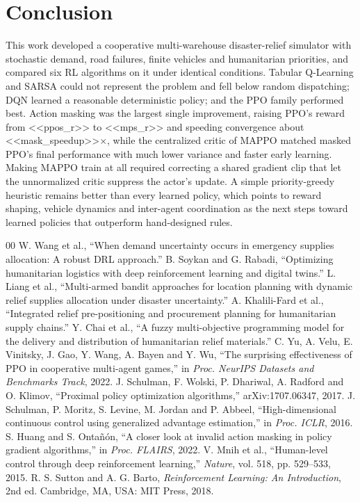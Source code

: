 \documentclass[conference]{IEEEtran}
\begin{document}
\section{Conclusion}
This work developed a cooperative multi-warehouse disaster-relief simulator with stochastic demand, road failures, finite vehicles and humanitarian priorities, and compared six RL algorithms on it under identical conditions. Tabular Q-Learning and SARSA could not represent the problem and fell below random dispatching; DQN learned a reasonable deterministic policy; and the PPO family performed best. Action masking was the largest single improvement, raising PPO's reward from <<ppos_r>> to <<mps_r>> and speeding convergence about <<mask_speedup>>$\times$, while the centralized critic of MAPPO matched masked PPO's final performance with much lower variance and faster early learning. Making MAPPO train at all required correcting a shared gradient clip that let the unnormalized critic suppress the actor's update. A simple priority-greedy heuristic remains better than every learned policy, which points to reward shaping, vehicle dynamics and inter-agent coordination as the next steps toward learned policies that outperform hand-designed rules.


\begin{thebibliography}{00}
 W. Wang et al., ``When demand uncertainty occurs in emergency supplies allocation: A robust DRL approach.''
 B. Soykan and G. Rabadi, ``Optimizing humanitarian logistics with deep reinforcement learning and digital twins.''
 L. Liang et al., ``Multi-armed bandit approaches for location planning with dynamic relief supplies allocation under disaster uncertainty.''
 A. Khalili-Fard et al., ``Integrated relief pre-positioning and procurement planning for humanitarian supply chains.''
 Y. Chai et al., ``A fuzzy multi-objective programming model for the delivery and distribution of humanitarian relief materials.''
 C. Yu, A. Velu, E. Vinitsky, J. Gao, Y. Wang, A. Bayen and Y. Wu, ``The surprising effectiveness of PPO in cooperative multi-agent games,'' in \emph{Proc. NeurIPS Datasets and Benchmarks Track}, 2022.
 J. Schulman, F. Wolski, P. Dhariwal, A. Radford and O. Klimov, ``Proximal policy optimization algorithms,'' arXiv:1707.06347, 2017.
 J. Schulman, P. Moritz, S. Levine, M. Jordan and P. Abbeel, ``High-dimensional continuous control using generalized advantage estimation,'' in \emph{Proc. ICLR}, 2016.
 S. Huang and S. Onta\~{n}\'{o}n, ``A closer look at invalid action masking in policy gradient algorithms,'' in \emph{Proc. FLAIRS}, 2022.
 V. Mnih et al., ``Human-level control through deep reinforcement learning,'' \emph{Nature}, vol. 518, pp. 529--533, 2015.
 R. S. Sutton and A. G. Barto, \emph{Reinforcement Learning: An Introduction}, 2nd ed. Cambridge, MA, USA: MIT Press, 2018.
\end{thebibliography}
\end{document}
